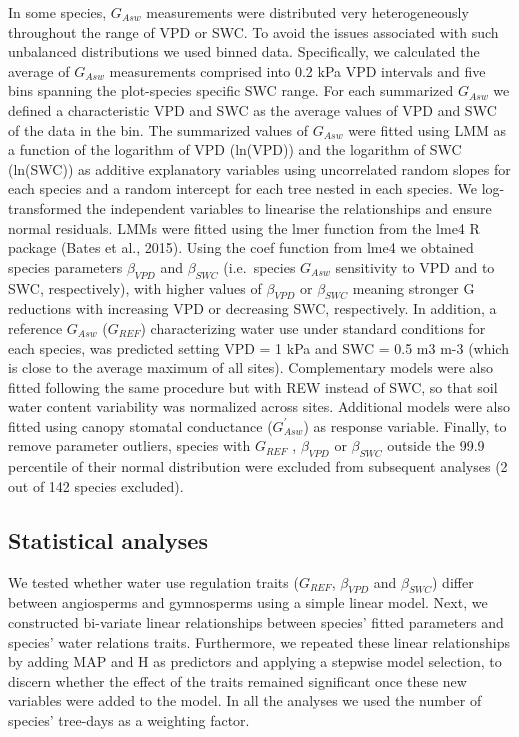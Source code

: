 \documentclass[11pt,twoside]{reedthesis}
\begin{document}
In some species, \(G_{Asw}\) measurements were distributed very
heterogeneously throughout the range of VPD or SWC. To avoid the issues
associated with such unbalanced distributions we used binned data.
Specifically, we calculated the average of \(G_{Asw}\) measurements
comprised into 0.2 kPa VPD intervals and five bins spanning the
plot-species specific SWC range. For each summarized \(G_{Asw}\) we
defined a characteristic VPD and SWC as the average values of VPD and
SWC of the data in the bin. The summarized values of \(G_{Asw}\) were
fitted using LMM as a function of the logarithm of VPD (ln(VPD)) and the
logarithm of SWC (ln(SWC)) as additive explanatory variables using
uncorrelated random slopes for each species and a random intercept for
each tree nested in each species. We log-transformed the independent
variables to linearise the relationships and ensure normal residuals.
LMMs were fitted using the lmer function from the lme4 R package (Bates
et al., 2015). Using the coef function from lme4 we obtained species
parameters \(\beta_{VPD}\) and \(\beta_{SWC}\) (i.e.~species \(G_{Asw}\)
sensitivity to VPD and to SWC, respectively), with higher values of
\(\beta_{VPD}\) or \(\beta_{SWC}\) meaning stronger G reductions with
increasing VPD or decreasing SWC, respectively. In addition, a reference
\(G_{Asw}\) (\(G_{REF}\)) characterizing water use under standard
conditions for each species, was predicted setting VPD = 1 kPa and SWC =
0.5 m3 m-3 (which is close to the average maximum of all sites).
Complementary models were also fitted following the same procedure but
with REW instead of SWC, so that soil water content variability was
normalized across sites. Additional models were also fitted using canopy
stomatal conductance (\(G_{Asw}^{'}\)) as response variable. Finally, to
remove parameter outliers, species with \(G_{REF}\) , \(\beta_{VPD}\) or
\(\beta_{SWC}\) outside the 99.9 percentile of their normal distribution
were excluded from subsequent analyses (2 out of 142 species
excluded).\par

\subsection{Statistical analyses}\label{statistical-analyses}

We tested whether water use regulation traits (\(G_{REF}\),
\(\beta_{VPD}\) and \(\beta_{SWC}\)) differ between angiosperms and
gymnosperms using a simple linear model. Next, we constructed bi-variate
linear relationships between species' fitted parameters and species'
water relations traits. Furthermore, we repeated these linear
relationships by adding MAP and H as predictors and applying a stepwise
model selection, to discern whether the effect of the traits remained
significant once these new variables were added to the model. In all the
analyses we used the number of species' tree-days as a weighting
factor.\par
\end{document}
